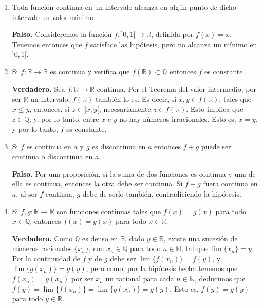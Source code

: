 \documentclass[10pt,a4paper]{article}
\begin{document}
\begin{enumerate}
		\item Toda función continua en un intervalo alcanza en algún punto de dicho intervalo un valor mínimo.
		
		\textbf{Falso. }Consideremos la función $f : ]0, 1[ \rightarrow \mathbb{R}$, definida por $f(x) = x$. Tenemos entonces que $f$ satisface las hipótesis, pero no alcanza un mínimo en $]0, 1[$. \newline
		
		\item Si $f : \mathbb{R} \rightarrow \mathbb{R}$ es continua y verifica que $f(\mathbb{R}) \subset \mathbb{Q}$ entonces $f$ es constante.
		
		\textbf{Verdadero. }Sea $f: \mathbb{R} \rightarrow \mathbb{R}$ continua. Por el Teorema del valor intermedio, por ser $\mathbb{R}$ un intervalo, $f(\mathbb{R})$ también lo es. Es decir, si $x, y \in f(\mathbb{R})$, tales que $ x \leq y$, entonces, si $z \in ]x, y[$, necesariamente $z \in f(\mathbb{R})$. Esto implica que $z \in \mathbb{Q}$, y, por lo tanto, entre $x$ e $y$ no hay números irracionales. Esto es, $x = y$, y por lo tanto, $f$ es constante. \newline
		
		\item Si $f$ es continua en $a$ y $g$ es discontinua en $a$ entonces $f + g$ puede ser continua o discontinua en $a$.
		
		\textbf{Falso. }Por una proposición, si la suma de dos funciones es continua y una de ella es continua, entonces la otra debe ser continua. Si $f + g$ fuera continua en $a$, al ser $f$ continua, $g$ debe de serlo también, contradiciendo la hipótesis. \newline
		
		\item Si $f, g : \mathbb{R} \rightarrow \mathbb{R}$ son funciones continuas tales que $f(x) = g(x)$ para todo $x \in \mathbb{Q}$, entonces $f(x) = g(x)$ para todo $x \in \mathbb{R}$.
		
		\textbf{Verdadero. }Como $\mathbb{Q}$ es denso en $\mathbb{R}$, dado $y \in \mathbb{R}$, existe una sucesión de números racionales $\{x_n\}$, con $x_n \in \mathbb{Q}$ para todo $n \in \mathbb{N}$, tal que $\lim\{x_n\} = y$. Por la continuidad de $f$ y de $g$ debe ser $\lim\{f(x_n)\} = f(y)$, y $\lim \{g(x_n)\} = g(y)$, pero como, por la hipótesis hecha tenemos que $f(x_n) = g(x_n)$ por ser $x_n$ un racional para cada $n \in \mathbb{N}$, deducimos que $f(y) = \lim\{f(x_n)\} = \lim \{g(x_n)\} = g(y)$. Esto es, $f(y) = g(y)$ para todo $y \in \mathbb{R}$. \newline
		

\end{enumerate}
\end{document}
